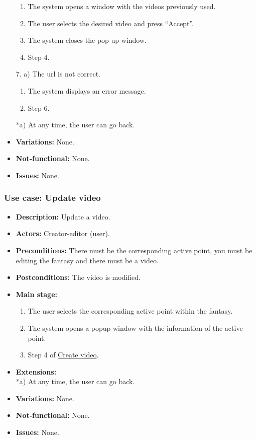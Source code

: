 \begin{itemize}
\begin{enumerate}
		\item The system opens a window with the videos previously used.
		\item The user selects the desired video and press ``Accept''.
		\item The system closes the pop-up window.
		\item Step 4.
	\end{enumerate}
	7. a) The url is not correct.
	\begin{enumerate}
		\item The system displays an error message.
		\item Step 6.
	\end{enumerate}
	*a) At any time, the user can go back.
	\item \textbf{Variations:} None.
	\item \textbf{Not-functional:} None.
	\item \textbf{Issues:} None.
\end{itemize}

\subsubsection{Use case: Update video}
\begin{itemize}
	\item \textbf{Description:} Update a video.
	\item \textbf{Actors:} Creator-editor (user).
	\item \textbf{Preconditions:} There must be the corresponding active point, you must be editing the fantasy and there must be a video.
	\item \textbf{Postconditions:} The video is modified.
	\item \textbf{Main stage:}
	\begin{enumerate}
		\item The user selects the corresponding active point within the fantasy.
		\item The system opens a popup window with the information of the active point.
		\item Step 4 of \hyperlink{crearvideo}{Create video}.
	\end{enumerate}
	\item \textbf{Extensions:} \\ *a) At any time, the user can go back.
	\item \textbf{Variations:} None.
	\item \textbf{Not-functional:} None.
	\item \textbf{Issues:} None.
\end{itemize}

